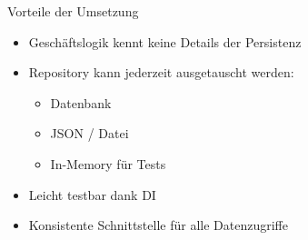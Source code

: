 \begin{frame}{Vorteile der Umsetzung}
    \begin{itemize}
        \item Geschäftslogik kennt keine Details der Persistenz
        \item Repository kann jederzeit ausgetauscht werden:
        \begin{itemize}
            \item Datenbank
            \item JSON / Datei
            \item In-Memory für Tests
        \end{itemize}
        \item Leicht testbar dank DI
        \item Konsistente Schnittstelle für alle Datenzugriffe
    \end{itemize}
\end{frame}
